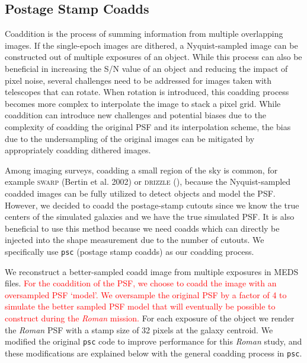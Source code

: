 \documentclass[fleqn,usenatbib]{mnras}
\begin{document}
\subsection{Postage Stamp Coadds}
\label{subsec:psc}
Coaddition is the process of summing information from multiple overlapping images. If the single-epoch images are dithered, a Nyquist-sampled image can be constructed out of multiple exposures of an object. While this process can also be beneficial in increasing the S/N value of an object and reducing the impact of pixel noise, several challenges need to be addressed for images taken with telescopes that can rotate. When rotation is introduced, this coadding process becomes more complex to interpolate the image to stack a pixel grid. While coaddition can introduce new challenges and potential biases due to the complexity of coadding the original PSF and its interpolation scheme, the bias due to the undersampling of the original images can be mitigated by appropriately coadding dithered images. 

Among imaging surveys, coadding a small region of the sky is common, for example \textsc{swarp} (Bertin et al. 2002) or \textsc{drizzle} (\citealt{2002PASP..114..144F}), because the Nyquist-sampled coadded images can be fully utilized to detect objects and model the PSF. However, we decided to coadd the postage-stamp cutouts since we know the true centers of the simulated galaxies and we have the true simulated PSF. It is also beneficial to use this method because we need coadds which can directly be injected into the shape measurement due to the number of cutouts. We specifically use \texttt{psc} (postage stamp coadds) as our coadding process.

We reconstruct a better-sampled coadd image from multiple exposures in MEDS files. \textcolor{red}{For the coaddition of the PSF, we choose to coadd the image with an oversampled PSF `model'. We oversample the original PSF by a factor of 4 to simulate the better sampled PSF model that will eventually be possible to construct during the \emph{Roman} mission.} For each exposure of the object we render the \emph{Roman} PSF with a stamp size of 32 pixels at the galaxy centroid. We modified the original \texttt{psc} code to improve performance for this \emph{Roman} study, and these modifications are explained below with the general coadding process in \texttt{psc}. 
\end{document}
